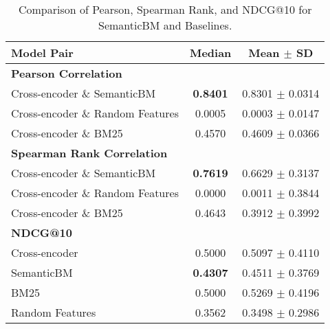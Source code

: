 \begin{table}[ht!]
  \caption{Comparison of Pearson, Spearman Rank, and NDCG@10 for SemanticBM and Baselines.}
  \label{tab:table_validation}
  \centering
  \begin{tabular}{lcc}
    \toprule
    \textbf{Model Pair} & \textbf{Median} & \textbf{Mean $\pm$ SD} \\
    \midrule
    \multicolumn{3}{l}{\textbf{Pearson Correlation}} \\
    Cross-encoder \& SemanticBM & \textbf{0.8401} & 0.8301 $\pm$ 0.0314 \\
    Cross-encoder \& Random Features & 0.0005 & 0.0003 $\pm$ 0.0147 \\
    Cross-encoder \& BM25 & 0.4570 & 0.4609 $\pm$ 0.0366 \\
    \midrule
    \multicolumn{3}{l}{\textbf{Spearman Rank Correlation}} \\
    Cross-encoder \& SemanticBM & \textbf{0.7619} & 0.6629 $\pm$ 0.3137 \\
    Cross-encoder \& Random Features & 0.0000 & 0.0011 $\pm$ 0.3844 \\
    Cross-encoder \& BM25 & 0.4643 & 0.3912 $\pm$ 0.3992 \\
    \midrule
    \multicolumn{3}{l}{\textbf{NDCG@10}} \\
    Cross-encoder & 0.5000 & 0.5097 $\pm$ 0.4110 \\
    SemanticBM & \textbf{0.4307} & 0.4511 $\pm$ 0.3769 \\
    BM25 & 0.5000 & 0.5269 $\pm$ 0.4196 \\
    Random Features & 0.3562 & 0.3498 $\pm$ 0.2986 \\
    \bottomrule
  \end{tabular}
\end{table}



